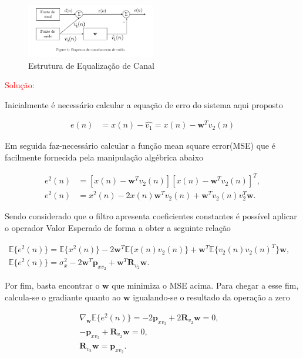 \documentclass[a4paper,10pt]{article}
\begin{document}
\begin{enumerate}
				\begin{figure}[H]
					\centering
					\includegraphics[width=0.5\textwidth]{figs/cancelamento_ruido.png}
					\caption{Estrutura de Equalização de Canal}
				\end{figure}
				
				\textcolor{red}{Solução:}
				
				Inicialmente é necessário calcular a equação de erro do sistema aqui proposto
				
				\begin{align}
					e(n) &= x(n) - \hat{v_{1}} = x(n) - \mathbf{w}^{T}v_{2}(n)
				\end{align}
				
				Em seguida faz-necessário calcular a função mean square error(MSE) que é facilmente fornecida pela manipulação algébrica abaixo
				
				\begin{align}
					e^{2}(n) &= [x(n) - \mathbf{w}^{T}v_{2}(n)][x(n) - \mathbf{w}^{T}v_{2}(n)]^{T}, \\
					e^{2}(n) &= x^{2}(n) - 2x(n)\mathbf{w}^{T}v_{2}(n) + \mathbf{w}^{T}v_{2}(n)v_{2}^{T}\mathbf{w}.
				\end{align}
				
				Sendo considerado que o filtro apresenta coeficientes constantes é possível aplicar o operador Valor Esperado de forma a obter a seguinte relação
				
				\begin{align}
					\mathbb{E}\{e^{2}(n)\} = \mathbb{E}\{x^{2}(n)\} - 2\mathbf{w}^{T}\mathbb{E}\{x(n) v_{2}(n)\} + \mathbf{w}^{T}\mathbb{E}\{v_{2}(n)v_{2}(n)^{T}\} \mathbf{w},& \\
					\mathbb{E}\{e^{2}(n)\} = \sigma^{2}_{x} - 2\mathbf{w}^{T}\mathbf{p}_{xv_{2}} + \mathbf{w}^{T}\mathbf{R}_{v_{2}} \mathbf{w}.&
				\end{align}
				
				Por fim, basta encontrar o $\mathbf{w}$ que minimiza o MSE acima. Para chegar a esse fim, calcula-se o gradiante quanto ao $\mathbf{w}$ igualando-se o resultado da operação a zero
				
				\begin{align}
					\nabla_{\mathbf{w}} \mathbb{E}\{e^{2}(n)\} = - 2\mathbf{p}_{xv_{2}} + 2\mathbf{R}_{v_{2}} \mathbf{w} = 0,& \\
					-\mathbf{p}_{xv_{2}} + \mathbf{R}_{v_{2}} \mathbf{w} = 0,& \\
					\mathbf{R}_{v_{2}} \mathbf{w} = \mathbf{p}_{xv_{2}}.&
				\end{align}
				

\end{enumerate}
\end{document}
